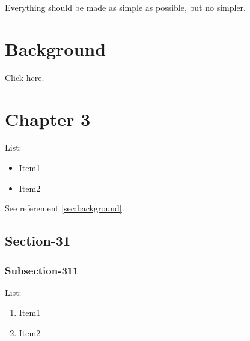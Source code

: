 \documentclass[a4paper,10pt]{report}
\begin{document}
 \begin{displayquote}Everything should be made as simple as possible, but no simpler.\end{displayquote}

\blindtext %



\chapter{Background}\label{chap:background}

Click \href{https://github.com/}{here}.
\blindtext %


\chapter{Chapter 3}\label{chap:chapter-3}

List:
\begin{itemize}
  \item Item1
  \item Item2
\end{itemize}

See referement \ref{sec:background}.


\section{Section-31}\label{sec:sec-31}
\subsection{Subsection-311}\label{subsec:subsection-311}

List:
\begin{enumerate}
  \item Item1
  \item Item2
\end{enumerate}
\end{document}
